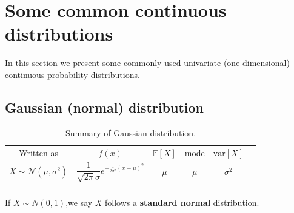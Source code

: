 \documentclass[graybox, envcountchap, twocolumn]{styles/svmult}
\begin{document}
\section{Some common continuous distributions}
In this section we present some commonly used univariate (one-dimensional) continuous probability distributions.


\subsection{Gaussian (normal) distribution}


\begin{table}
\caption{Summary of Gaussian distribution.}
\centering
\begin{tabular}{cccccc}
\hline\noalign{\smallskip}
Written as & $f(x)$ & $\mathbb{E}[X]$ & mode & $\text{var}[X]$ \\
\noalign{\smallskip}\svhline\noalign{\smallskip}
$X \sim \mathcal{N}(\mu,\sigma^2)$ & $\dfrac{1}{\sqrt{2\pi}\sigma}e^{-\frac{1}{2\sigma^2}\left(x-\mu\right)^2}$ & $\mu$ & $\mu$ & $\sigma^2$ \\
\noalign{\smallskip}\hline
\end{tabular}
\end{table} 

If $X \sim N(0,1)$,we say $X$ follows a \textbf{standard normal} distribution.
\end{document}
